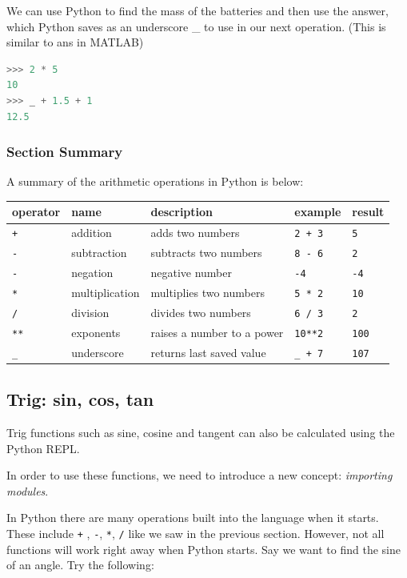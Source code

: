 \documentclass{book}
\begin{document}
We can use Python to find the mass of the batteries and then use the
answer, which Python saves as an underscore \_ to use in our next
operation. (This is similar to ans in MATLAB)

\begin{lstlisting}[language=Python]
>>> 2 * 5 
10
>>> _ + 1.5 + 1
12.5
\end{lstlisting}

    \subsubsection{Section Summary}\label{section-summary}

A summary of the arithmetic operations in Python is below:

\begin{longtable}[]{@{}lllll@{}}
\toprule
operator & name & description & example & result\tabularnewline
\midrule
\endhead
\lstinline!+! & addition & adds two numbers & \lstinline!2 + 3! &
\lstinline!5!\tabularnewline
\lstinline!-! & subtraction & subtracts two numbers & \lstinline!8 - 6!
& \lstinline!2!\tabularnewline
\lstinline!-! & negation & negative number & \lstinline!-4! &
\lstinline!-4!\tabularnewline
\lstinline!*! & multiplication & multiplies two numbers &
\lstinline!5 * 2! & \lstinline!10!\tabularnewline
\lstinline!/! & division & divides two numbers & \lstinline!6 / 3! &
\lstinline!2!\tabularnewline
\lstinline!**! & exponents & raises a number to a power &
\lstinline!10**2! & \lstinline!100!\tabularnewline
\lstinline!_! & underscore & returns last saved value &
\lstinline!_ + 7! & \lstinline!107!\tabularnewline
\bottomrule
\end{longtable}

    \subsection{Trig: sin, cos, tan}\label{trig-sin-cos-tan}

    Trig functions such as sine, cosine and tangent can also be calculated
using the Python REPL.

In order to use these functions, we need to introduce a new concept:
\emph{importing modules}.

In Python there are many operations built into the language when it
starts. These include \lstinline!+! , \lstinline!-!, \lstinline!*!,
\lstinline!/! like we saw in the previous section. However, not all
functions will work right away when Python starts. Say we want to find
the sine of an angle. Try the following:
\end{document}
